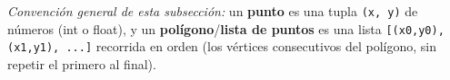 \textit{Convención general de esta subsección:} un \textbf{punto} es una tupla \texttt{(x, y)} de números (int o float), y un \textbf{polígono}/\textbf{lista de puntos} es una lista \texttt{[(x0,y0), (x1,y1), ...]} recorrida en orden (los vértices consecutivos del polígono, sin repetir el primero al final).
